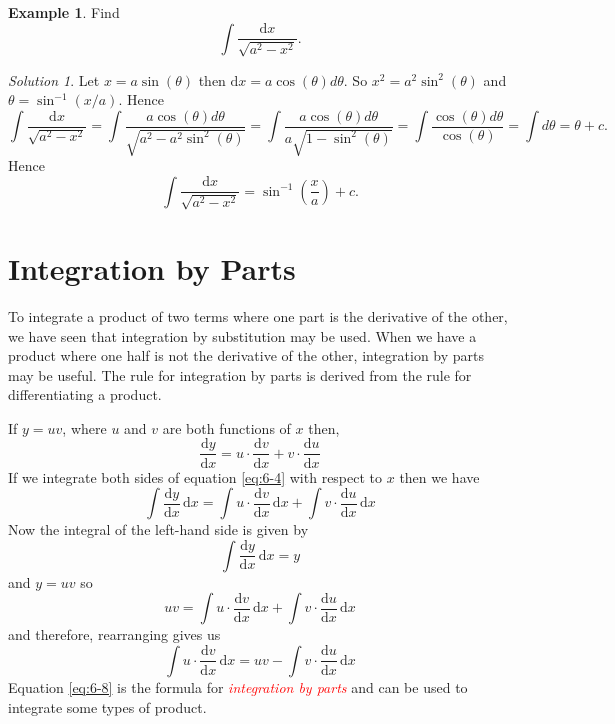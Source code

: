 \documentclass[
  11pt,
  oneside]{book}
\newcommand{\slide}{}
\theoremstyle{definition}
\theoremstyle{definition}
\newtheorem{example}{Example}[chapter]
\theoremstyle{definition}
\theoremstyle{definition}
\theoremstyle{remark}
\newtheorem*{solution}{Solution}
\begin{document}
\slide

\begin{example}
Find
\[
\int\frac{\mathrm{d}x}{\sqrt{a^2-x^2}}.
\]
\end{example}

\begin{solution}
Let \(x = a\sin(\theta)\) then \(\mathrm{d}x = a\cos(\theta)d\theta\). So \(x^2 = a^2\sin^2(\theta)\) and \(\theta = \sin^{-1}(x/a)\). Hence
\[
\int\frac{\mathrm{d}x}{\sqrt{a^2-x^2}} = \int\frac{a\cos(\theta)d\theta}{\sqrt{a^2-a^2\sin^2(\theta)}} = \int\frac{a\cos(\theta)d\theta}{a\sqrt{1-\sin^2(\theta)}} = \int\frac{\cos(\theta)d\theta}{\cos(\theta)} = \int d\theta = \theta + c.
\]
Hence
\[
\int\frac{\mathrm{d}x}{\sqrt{a^2-x^2}} = \sin^{-1}\left(\frac xa\right) + c.
\]
\end{solution}

\slide

\section{Integration by Parts}\label{integration-by-parts}

To integrate a product of two terms where one part is the derivative of the other, we have seen that integration by substitution may be used. When we have a product where one half is not the derivative of the other, integration by parts may be useful. The rule for integration by parts is derived from the rule for differentiating a product.

If \(y = uv\), where \(u\) and \(v\) are both functions of \(x\) then,
\begin{equation}
\frac{\mathrm{d}y}{\mathrm{d}x} = u\cdot\frac{\mathrm{d}v}{\mathrm{d}x} + v\cdot\frac{\mathrm{d}u}{\mathrm{d}x}
\label{eq:6-4}
\end{equation}
If we integrate both sides of equation \eqref{eq:6-4} with respect to \(x\) then we have
\begin{equation}
\int\frac{\mathrm{d}y}{\mathrm{d}x}\,\mathrm{d}x = \int u\cdot\frac{\mathrm{d}v}{\mathrm{d}x}\,\mathrm{d}x + \int v\cdot\frac{\mathrm{d}u}{\mathrm{d}x}\,\mathrm{d}x
\label{eq:6-5}
\end{equation}
Now the integral of the left-hand side is given by
\begin{equation}
\int\frac{\mathrm{d}y}{\mathrm{d}x}\,\mathrm{d}x = y
\label{eq:6-6}
\end{equation}
and \(y = uv\) so
\begin{equation}
uv =\int u\cdot\frac{\mathrm{d}v}{\mathrm{d}x}\,\mathrm{d}x +\int v\cdot\frac{\mathrm{d}u}{\mathrm{d}x}\,\mathrm{d}x
\label{eq:6-7}
\end{equation}
and therefore, rearranging gives us
\begin{equation}
\int u\cdot \frac{\mathrm{d}v}{\mathrm{d}x}\,\mathrm{d}x = uv -\int v\cdot\frac{\mathrm{d}u}{\mathrm{d}x}\,\mathrm{d}x
\label{eq:6-8}
\end{equation}
Equation \eqref{eq:6-8} is the formula for \textcolor{red}{\em integration by parts} and can be used to integrate some types of
product.
\end{document}
